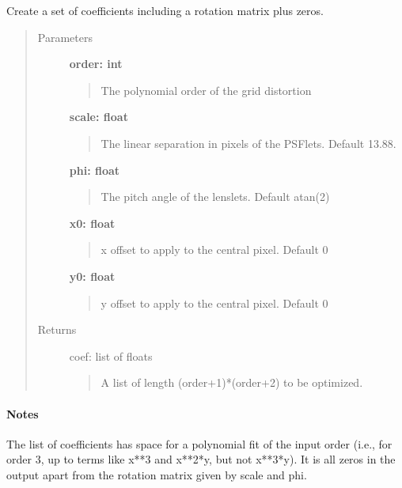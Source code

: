 \documentclass[letterpaper,10pt,english]{sphinxmanual}
\begin{document}

\begin{fulllineitems}
\label{tools:tools.locate_psflets.initcoef}
Create a set of coefficients including a rotation matrix plus zeros.
\begin{quote}\begin{description}
\item[{Parameters}] \leavevmode
\textbf{order: int}
\begin{quote}

The polynomial order of the grid distortion
\end{quote}

\textbf{scale: float}
\begin{quote}

The linear separation in pixels of the PSFlets. Default 13.88.
\end{quote}

\textbf{phi:   float}
\begin{quote}

The pitch angle of the lenslets.  Default atan(2)
\end{quote}

\textbf{x0:    float}
\begin{quote}

x offset to apply to the central pixel. Default 0
\end{quote}

\textbf{y0:    float}
\begin{quote}

y offset to apply to the central pixel. Default 0
\end{quote}

\item[{Returns}] \leavevmode
coef: list of floats
\begin{quote}

A list of length (order+1)*(order+2) to be optimized.
\end{quote}

\end{description}\end{quote}
\paragraph{Notes}

The list of coefficients has space for a polynomial fit of the
input order (i.e., for order 3, up to terms like x**3 and x**2*y,
but not x**3*y).  It is all zeros in the output apart from the 
rotation matrix given by scale and phi.

\end{fulllineitems}
\end{document}
